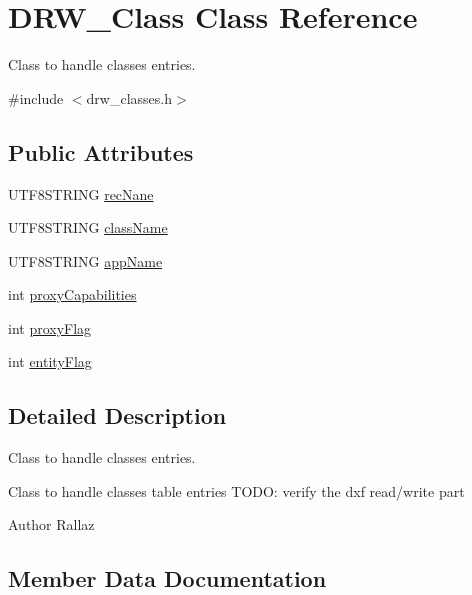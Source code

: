 \hypertarget{class_d_r_w___class}{}\section{D\+R\+W\+\_\+\+Class Class Reference}
\label{class_d_r_w___class}


Class to handle classes entries.  




{\ttfamily \#include $<$drw\+\_\+classes.\+h$>$}

\subsection*{Public Attributes}
\begin{DoxyCompactItemize}
\item 
U\+T\+F8\+S\+T\+R\+I\+N\+G \hyperlink{class_d_r_w___class_ac3470fefc02faf7f2eb5dff1dac7af9a}{rec\+Nane}
\item 
U\+T\+F8\+S\+T\+R\+I\+N\+G \hyperlink{class_d_r_w___class_acde079b8bf4ff8e12ddbb592d492a22f}{class\+Name}
\item 
U\+T\+F8\+S\+T\+R\+I\+N\+G \hyperlink{class_d_r_w___class_a15b27bae29a5245c739f3de255e65760}{app\+Name}
\item 
int \hyperlink{class_d_r_w___class_a6a472aad89b499e5b0dd4a5c2c07b735}{proxy\+Capabilities}
\item 
int \hyperlink{class_d_r_w___class_a093a40e69719110340d4954cdcfde582}{proxy\+Flag}
\item 
int \hyperlink{class_d_r_w___class_ab6d13ec9b7720e2b04533d0adbb6b1f6}{entity\+Flag}
\end{DoxyCompactItemize}


\subsection{Detailed Description}
Class to handle classes entries. 

Class to handle classes table entries T\+O\+D\+O\+: verify the dxf read/write part \begin{DoxyAuthor}{Author}
Rallaz 
\end{DoxyAuthor}


\subsection{Member Data Documentation}
\hypertarget{class_d_r_w___class_a15b27bae29a5245c739f3de255e65760}{}
